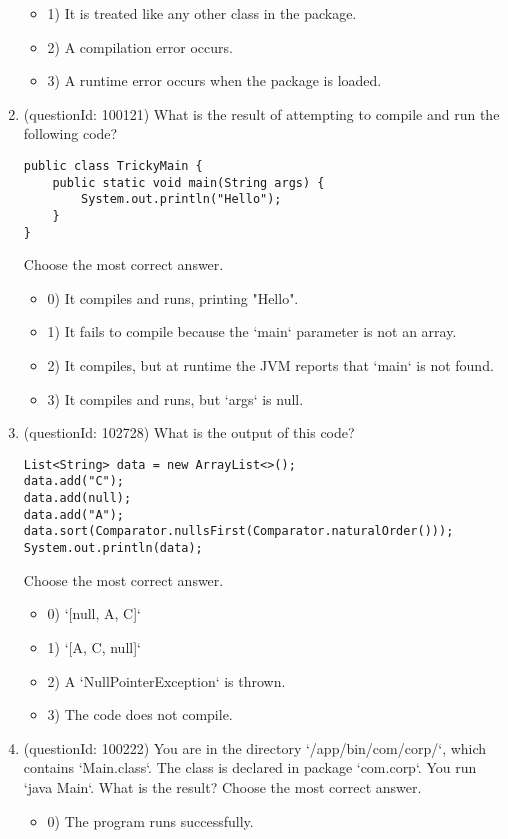 \documentclass[12pt]{article}
\begin{document}
\begin{enumerate}[label=(\arabic*)]
\begin{itemize}
\item 1) It is treated like any other class in the package.

\item 2) A compilation error occurs.

\item 3) A runtime error occurs when the package is loaded.

\end{itemize}
\item (questionId: 100121) What is the result of attempting to compile and run the following code?
\begin{verbatim}
public class TrickyMain {
    public static void main(String args) {
        System.out.println("Hello");
    }
}
\end{verbatim}
Choose the most correct answer. 
\begin{itemize}
\item 0) It compiles and runs, printing "Hello".

\item 1) It fails to compile because the `main` parameter is not an array.

\item 2) It compiles, but at runtime the JVM reports that `main` is not found.

\item 3) It compiles and runs, but `args` is null.

\end{itemize}
\item (questionId: 102728) What is the output of this code?
\begin{verbatim}
List<String> data = new ArrayList<>();
data.add("C");
data.add(null);
data.add("A");
data.sort(Comparator.nullsFirst(Comparator.naturalOrder()));
System.out.println(data);
\end{verbatim}
Choose the most correct answer. 
\begin{itemize}
\item 0) `[null, A, C]`

\item 1) `[A, C, null]`

\item 2) A `NullPointerException` is thrown.

\item 3) The code does not compile.

\end{itemize}
\item (questionId: 100222) You are in the directory `/app/bin/com/corp/`, which contains `Main.class`. The class is declared in package `com.corp`. You run `java Main`. What is the result?
Choose the most correct answer. 
\begin{itemize}
\item 0) The program runs successfully.


\end{itemize}
\end{enumerate}
\end{document}
